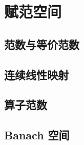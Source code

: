 \section{赋范空间}
\label{b1:sec:0801}


\subsection{范数与等价范数}
\label{b1:subsec:080101}

\subsection{连续线性映射}
\label{b1:subsec:080102}

\subsection{算子范数}
\label{b1:subsec:080103}

\subsection{Banach 空间}
\label{b1:subsec:080104}


